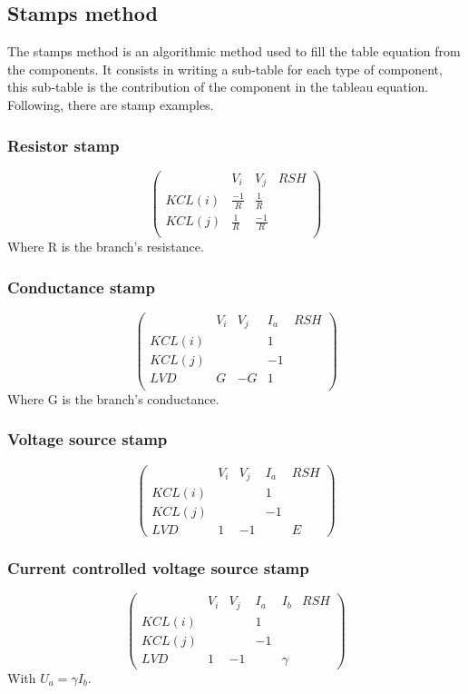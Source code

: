 \subsection{Stamps method}
The stamps method is an algorithmic method used to fill the table equation from the components. It
consists in writing a sub-table for each type of component, this sub-table is the contribution of the component in the tableau equation.\\
Following, there are stamp examples.
\subsubsection{Resistor stamp}
\[\left(\begin{array}{cccc}
&V_{i}&V_{j}&RSH\\
  \hline
  KCL(i)&\frac{-1}{R}&\frac{1}{R}&\\
  KCL(j)&\frac{1}{R}&\frac{-1}{R}&\\
  \end{array}\right)
\]
Where R is the branch's resistance.
\subsubsection{Conductance stamp}
\[\left(\begin{array}{ccccc}
&V_{i}&V_{j}&I_{a}&RSH\\
  \hline
  KCL(i)&&&1&\\
  KCL(j)&&&-1&\\
  LVD&G&-G&1&\\
  \end{array}\right)
\]
Where G is the branch's conductance.
\subsubsection{Voltage source stamp}
\[\left(\begin{array}{ccccc}
&V_{i}&V_{j}&I_{a}&RSH\\
  \hline
  KCL(i)&&&1\\
  KCL(j)&&&-1\\
  LVD&1&-1&&E
  \end{array}\right)
\]
\subsubsection{Current controlled voltage source stamp}
\[\left(\begin{array}{cccccc}
&V_{i}&V_{j}&I_{a}&I_{b}&RSH\\
  \hline
  KCL(i)&&&1&\\
  KCL(j)&&&-1&\\
  LVD&1&-1&&\gamma
  \end{array}\right)
\]
With $U_{a} = \gamma I_{b}$.
